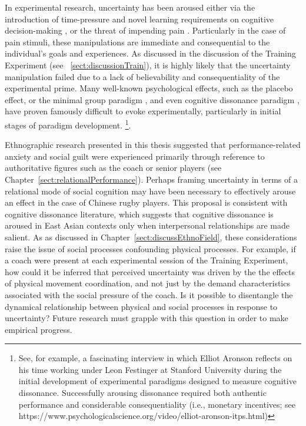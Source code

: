 In experimental research, uncertainty has been aroused either via the introduction of time-pressure and novel learning requirements on cognitive decision-making \citep[see:][]{Daw2005,Kording2006}, or the threat of impending pain \citep[e.g.,][]{Voigt1990,Moutoussis2014}.  Particularly in the case of pain stimuli, these manipulations are immediate and consequential to the individual's goals and experiences.  As discussed in the discussion of the Training Experiment (see ~\ref{sect:discussionTrain}), it is highly likely that the uncertainty manipulation failed due to a lack of believability and consequentiality of the experimental prime.  Many well-known psychological effects, such as the placebo effect, or the minimal group paradigm \citep[586]{Liu2009}, and even cognitive dissonance paradigm \citep{Kenworthy2011}, have proven famously difficult to evoke experimentally, particularly in initial stages of paradigm development. \footnote{See, for example, a fascinating interview in which Elliot Aronson reflects on his time working under Leon Festinger at Stanford University during the initial development of experimental paradigms designed to measure cognitive dissonance.  Successfully arousing dissonance required both authentic performance and considerable consequentiality (i.e., monetary incentives; see https://www.psychologicalscience.org/video/elliot-aronson-itps.html)}.

Ethnographic research presented in this thesis suggested that performance-related anxiety and social guilt were experienced primarily through reference to authoritative figures such as the coach or senior players (see Chapter~\ref{sect:relationalPerformance}).  Perhaps framing uncertainty in terms of a relational mode of social cognition may have been necessary to effectively arouse an effect in the case of Chinese rugby players.  This proposal is consistent with cognitive dissonance literature, which suggests that cognitive dissonance is aroused in East Asian contexts only when interpersonal relationships are made salient\citep{Hoshino-Browne2005}.   As as discussed in Chapter~\ref{sect:discussEthnoField}, these considerations raise the issue of social processes confounding physical processes.  For example, if a coach were present at each experimental session of the Training Experiment, how could it be inferred that perceived uncertainty was driven by the the effects of physical movement coordination, and not just by the demand characteristics associated with the social pressure of the coach.  Is it possible to disentangle the dynamical relationship between physical and social processes in response to uncertainty?  Future research must grapple with this question in order to make empirical progress.

